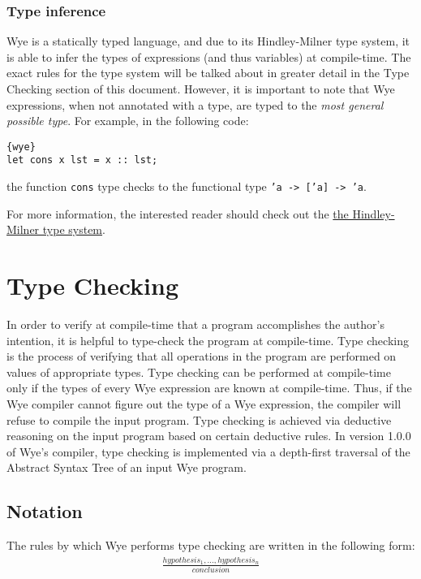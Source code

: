 \documentclass[a4paper, 12pt]{article}
\theoremstyle{myplain}
\theoremstyle{mydefinition}
\theoremstyle{myremark}
\numberwithin{equation} {section}
\numberwithin{figure}   {section}
\numberwithin{table}    {section}
\newcommand{\version}{1.0.0}
\begin{document}
\subsubsection{Type inference}

Wye is a statically typed language, and due to its Hindley-Milner type system, it is able to infer the types of expressions (and thus variables) at compile-time. The exact rules for the type system will be talked about in greater detail in the Type Checking section of this document. However, it is important to note that Wye expressions, when not annotated with a type, are typed to the \textit{most general possible type}. For example, in the following code:
\begin{lstlisting}{wye}
let cons x lst = x :: lst;
\end{lstlisting}
the function \texttt{cons} type checks to the functional type \texttt{'a -> ['a] -> 'a}.

For more information, the interested reader should check out the \href{{https://en.wikipedia.org/wiki/Hindley%

\section{Type Checking}

In order to verify at compile-time that a program accomplishes the author's intention, it is helpful to type-check the program at compile-time. Type checking is the process of verifying that all operations in the program are performed on values of appropriate types. Type checking can be performed at compile-time only if the types of every Wye expression are known at compile-time. Thus, if the Wye compiler cannot figure out the type of a Wye expression, the compiler will refuse to compile the input program. Type checking is achieved via deductive reasoning on the input program based on certain deductive rules. In version \version{} of Wye's compiler, type checking is implemented via a depth-first traversal of the Abstract Syntax Tree of an input Wye program.

\subsection{Notation}

The rules by which Wye performs type checking are written in the following form:
\begin{align*}
\frac{hypothesis_1, ..., hypothesis_n}{conclusion}
\end{align*}
\end{document}
